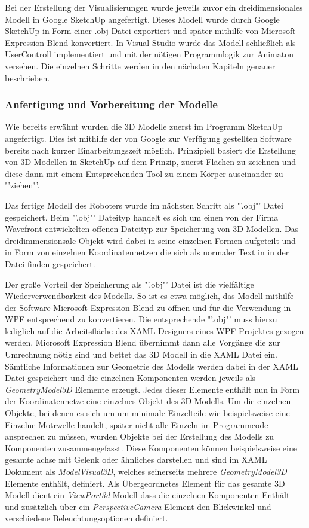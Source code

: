 Bei der Erstellung der Visualisierungen wurde jeweils zuvor ein dreidimensionales Modell in Google SketchUp angefertigt. Dieses Modell wurde durch Google SketchUp in Form einer .obj Datei exportiert und später mithilfe von Microsoft Expression Blend konvertiert. In Visual Studio wurde das Modell schließlich als UserControll implementiert und mit der nötigen Programmlogik zur Animaton versehen.
Die einzelnen Schritte werden in den nächsten Kapiteln genauer beschrieben.
\subsubsection{Anfertigung und Vorbereitung der Modelle}
Wie bereits erwähnt wurden die 3D Modelle zuerst im Programm SketchUp angefertigt. Dies ist mithilfe der von Google zur Verfügung gestellten Software bereits nach kurzer Einarbeitungszeit möglich. 
Prinzipiell basiert die Erstellung von 3D Modellen in SketchUp auf dem Prinzip, zuerst Flächen zu zeichnen und diese dann mit einem Entsprechenden Tool zu einem Körper auseinander zu "'ziehen"'.

Das fertige Modell des Roboters wurde im nächsten Schritt als "'.obj"' Datei gespeichert. Beim "'.obj"' Dateityp handelt es sich um einen von der Firma Wavefront entwickelten offenen Dateityp zur Speicherung von 3D Modellen. Das dreidimmensionsale Objekt wird dabei in seine einzelnen Formen aufgeteilt und in Form von einzelnen Koordinatennetzen die sich als normaler Text in in der Datei finden gespeichert.

Der große Vorteil der Speicherung als "'.obj"' Datei ist die vielfältige Wiederverwendbarkeit des Modells. So ist es etwa möglich, das Modell mithilfe der Software Microsoft Expression Blend zu öffnen und für die Verwendung in WPF entsprechend zu konvertieren. Die entsprechende "'.obj"' muss hierzu lediglich auf die Arbeitsfläche des XAML Designers eines WPF Projektes gezogen werden. Microsoft Expression Blend übernimmt dann alle Vorgänge die zur Umrechnung nötig sind und bettet das 3D Modell in die XAML Datei ein. 
Sämtliche Informationen zur Geometrie des Modells werden dabei in der XAML Datei gespeichert und die einzelnen Komponenten werden jeweils als \textit{GeometryModel3D} Elemente erzeugt.
Jedes dieser Elemente enthält nun in Form der Koordinatennetze eine einzelnes Objekt des 3D Modells. Um die einzelnen Objekte, bei denen es sich um um minimale Einzelteile wie beispielsweise eine Einzelne Motrwelle handelt, später nicht alle Einzeln im Programmcode ansprechen zu müssen, wurden Objekte bei der Erstellung des Modells zu Komponenten zusammengefasst. Diese Komponenten können beispielsweise eine gesamte achse mit Gelenk oder ähnliches darstellen und sind im XAML Dokument als \textit{ModelVisual3D}, welches seinerseits mehrere \textit{GeometryModel3D} Elemente enthält, definiert.
Als Übergeordnetes Element für das gesamte 3D Modell dient ein \textit{ViewPort3d} Modell dass die einzelnen Komponenten Enthält und zusätzlich über ein \textit{PerspectiveCamera} Element den Blickwinkel und verschiedene Beleuchtungsoptionen definiert.

